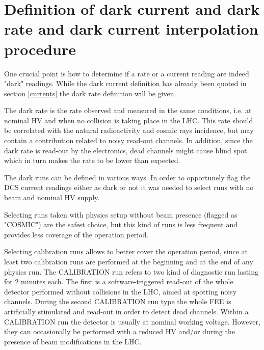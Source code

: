 \section{Definition of dark current and dark rate and dark current interpolation procedure}
One crucial point is how to determine if a rate or a current reading are indeed "dark" readings.
While the dark current definition has already been quoted in section \ref{currents} the dark rate definition will be given.

The dark rate is the rate observed and measured in the same conditions, i.e. at nominal HV and when no collision is taking place in the LHC.
This rate should be correlated with the natural radioactivity and cosmic rays incidence, but may contain a contribution related to noisy read-out channels.
In addition, since the dark rate is read-out by the electronics, dead channels might cause blind spot which in turn makes the rate to be lower than expected.

The dark runs can be defined in various ways.
In order to opportunely flag the DCS current readings either as dark or not it was needed to select runs with no beam and nominal HV supply.

Selecting runs taken with physics setup without beam presence (flagged as "COSMIC") are the safest choice, but this kind of runs is less frequent and provides less coverage of the operation period.

Selecting calibration runs allows to better cover the operation period, since at least two calibration runs are performed at the beginning and at the end of any physics run.
The CALIBRATION run refers to two kind of diagnostic run lasting for 2 minutes each.
The first is a software-triggered read-out of the whole detector performed without collisions in the LHC, aimed at spotting noisy channels.
During the second CALIBRATION run type the whole FEE is artificially stimulated and read-out in order to detect dead channels.
Within a CALIBRATION run the detector is usually at nominal working voltage.
However, they can occasionally be performed with a reduced HV and/or during the presence of beam modifications in the LHC.

